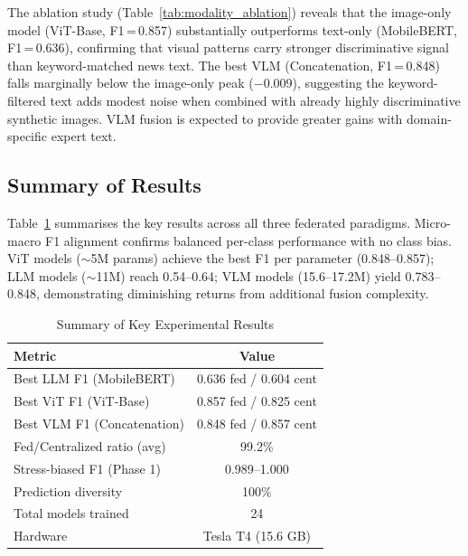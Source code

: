\documentclass[10pt,journal,compsoc]{IEEEtran}
\begin{document}
The ablation study (Table~\ref{tab:modality_ablation}) reveals that the image-only model (ViT-Base, F1\,=\,0.857) substantially outperforms text-only (MobileBERT, F1\,=\,0.636), confirming that visual patterns carry stronger discriminative signal than keyword-matched news text. The best VLM (Concatenation, F1\,=\,0.848) falls marginally below the image-only peak ($-$0.009), suggesting the keyword-filtered text adds modest noise when combined with already highly discriminative synthetic images. VLM fusion is expected to provide greater gains with domain-specific expert text.

\subsection{Summary of Results}

Table~\ref{tab:summary} summarises the key results across all three federated paradigms. Micro-macro F1 alignment confirms balanced per-class performance with no class bias. ViT models (${\sim}$5M params) achieve the best F1 per parameter (0.848--0.857); LLM models (${\sim}$11M) reach 0.54--0.64; VLM models (15.6--17.2M) yield 0.783--0.848, demonstrating diminishing returns from additional fusion complexity.

\begin{table}[htbp]
\centering
\caption{Summary of Key Experimental Results}
\label{tab:summary}
\small
\begin{tabular}{lc}
\toprule
\textbf{Metric} & \textbf{Value} \\
\midrule
Best LLM F1 (MobileBERT) & 0.636 fed / 0.604 cent \\
Best ViT F1 (ViT-Base) & 0.857 fed / 0.825 cent \\
Best VLM F1 (Concatenation) & 0.848 fed / 0.857 cent \\
Fed/Centralized ratio (avg) & 99.2\% \\
Stress-biased F1 (Phase 1) & 0.989--1.000 \\
Prediction diversity & 100\% \\
Total models trained & 24 \\
Hardware & Tesla T4 (15.6 GB) \\
\bottomrule
\end{tabular}
\end{table}

\end{document}
